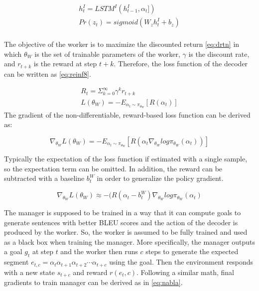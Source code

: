 \documentclass[preprint, 12pt]{elsarticle}
\begin{document}
		\begin{align}
			h_t^I = LSTM^I(h_{t-1}^I, \alpha_t]) \label{eq:reinf6} \\
			Pr(z_t) = sigmoid(W_zh_t^I + b_z) \label{eq:reinf7} \\
		\end{align}
		
		The objective of the worker is to maximize the discounted return \eqref{eq:drtn} in which $\theta_W$ is the set of trainable parameters of the worker, $\gamma$ is the discount rate, and $r_{t+k}$ is the reward at step $t+k$. Therefore, the loss function of the decoder can be written as \eqref{eq:reinf8}.
		
		\begin{align}
			R_t = \Sigma_{k=0}^\infty \gamma^k r_{t+k} \label{eq:drtn} \\
			L(\theta_W) = -E_{\alpha_t \sim \pi_{\theta_W}}[R(\alpha_t)] \label{eq:reinf8}		
		\end{align}
		The gradient of the non-differentiable, reward-based loss function can be derived as:
		
		\begin{equation}
			\nabla_{\theta_W} L(\theta_W) = - E_{\alpha_t \sim \pi_{\theta_W}} [R(\alpha_t \nabla_{\theta_W} log \pi_{\theta_W}(\alpha_t))]
		\end{equation}
		
		Typically the expectation of the loss function if estimated with a single sample, so the expectation term can be omitted. In addition, the reward can be subtracted with a baseline $b_t^W$ in order to generalize the policy gradient.
		
		\begin{equation}
			\nabla_{\theta_W} L(\theta_W) \approx -(R(\alpha_t - b_t^W) \nabla_{\theta_W} log \pi_{\theta_W} (\alpha_t)
		\end{equation}
		
		The manager is supposed to be trained in a way that it can compute goals to generate sentences with better BLEU scores and the action of the decoder is produced by the worker. So, the worker is assumed to be fully trained and used as a black box when training the manager. More specifically, the manager outputs a goal $g_t$ at step $t$ and the worker then runs $c$ steps to generate the expected segment $e_{t, c} = \alpha_t \alpha_{t+1} \alpha_{t+2} \cdots \alpha_{t+c}$ using the goal. Then the environment responds with a new state $s_{t+c}$ and reward $r(e_t, c)$. Following a similar math, final gradients to train manager can be derived as in \eqref{eq:nabla}.
		
\end{document}
